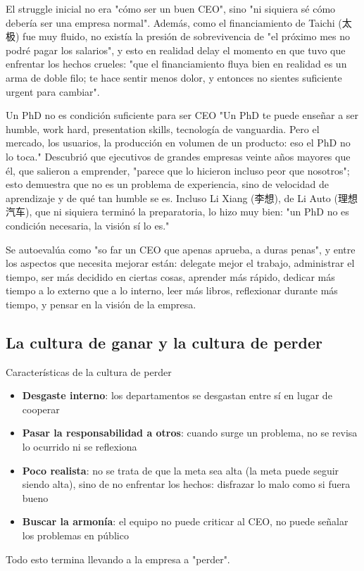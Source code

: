 \documentclass[a4paper]{article}
\begin{document}
El struggle inicial no era "cómo ser un buen CEO", sino "ni siquiera sé cómo debería ser una empresa normal". Además, como el financiamiento de Taichi (太极) fue muy fluido, no existía la presión de sobrevivencia de "el próximo mes no podré pagar los salarios", y esto en realidad delay el momento en que tuvo que enfrentar los hechos crueles: "que el financiamiento fluya bien en realidad es un arma de doble filo; te hace sentir menos dolor, y entonces no sientes suficiente urgent para cambiar".

\begin{knowledgebox}{Un PhD no es condición suficiente para ser CEO}
"Un PhD te puede enseñar a ser humble, work hard, presentation skills, tecnología de vanguardia. Pero el mercado, los usuarios, la producción en volumen de un producto: eso el PhD no lo toca." Descubrió que ejecutivos de grandes empresas veinte años mayores que él, que salieron a emprender, "parece que lo hicieron incluso peor que nosotros"; esto demuestra que no es un problema de experiencia, sino de velocidad de aprendizaje y de qué tan humble se es. Incluso Li Xiang (李想), de Li Auto (理想汽车), que ni siquiera terminó la preparatoria, lo hizo muy bien: "un PhD no es condición necesaria, la visión sí lo es."
\end{knowledgebox}

Se autoevalúa como "so far un CEO que apenas aprueba, a duras penas", y entre los aspectos que necesita mejorar están: delegate mejor el trabajo, administrar el tiempo, ser más decidido en ciertas cosas, aprender más rápido, dedicar más tiempo a lo externo que a lo interno, leer más libros, reflexionar durante más tiempo, y pensar en la visión de la empresa.

\subsection{La cultura de ganar y la cultura de perder}

\begin{warningbox}{Características de la cultura de perder}
\begin{itemize}
\item \textbf{Desgaste interno}: los departamentos se desgastan entre sí en lugar de cooperar
\item \textbf{Pasar la responsabilidad a otros}: cuando surge un problema, no se revisa lo ocurrido ni se reflexiona
\item \textbf{Poco realista}: no se trata de que la meta sea alta (la meta puede seguir siendo alta), sino de no enfrentar los hechos: disfrazar lo malo como si fuera bueno
\item \textbf{Buscar la armonía}: el equipo no puede criticar al CEO, no puede señalar los problemas en público
\end{itemize}
Todo esto termina llevando a la empresa a "perder".
\end{warningbox}
\end{document}

